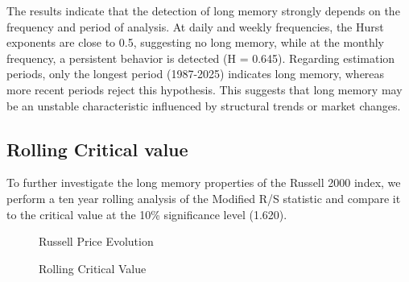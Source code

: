 \documentclass[11pt]{extarticle}
\begin{document}
\FloatBarrier

The results indicate that the detection of long memory strongly depends on the frequency and period of analysis.
At daily and weekly frequencies, the Hurst exponents are close to 0.5, suggesting no long memory, while at the monthly
frequency, a persistent behavior is detected (H = 0.645). Regarding estimation periods, only the longest period
(1987-2025) indicates long memory, whereas more recent periods reject this hypothesis. This suggests that long memory
may be an unstable characteristic influenced by structural trends or market changes.


\subsection{Rolling Critical value}

To further investigate the long memory properties of the Russell 2000 index,
we perform a ten year rolling analysis of the Modified R/S statistic and compare it to the critical value at the
10\% significance level (1.620).


\begin{figure}[htbp]
    \centering
    \caption{Russell Price Evolution}
\end{figure}

\begin{figure}[htbp]
    \centering
    \caption{Rolling Critical Value}
\end{figure}
\end{document}
